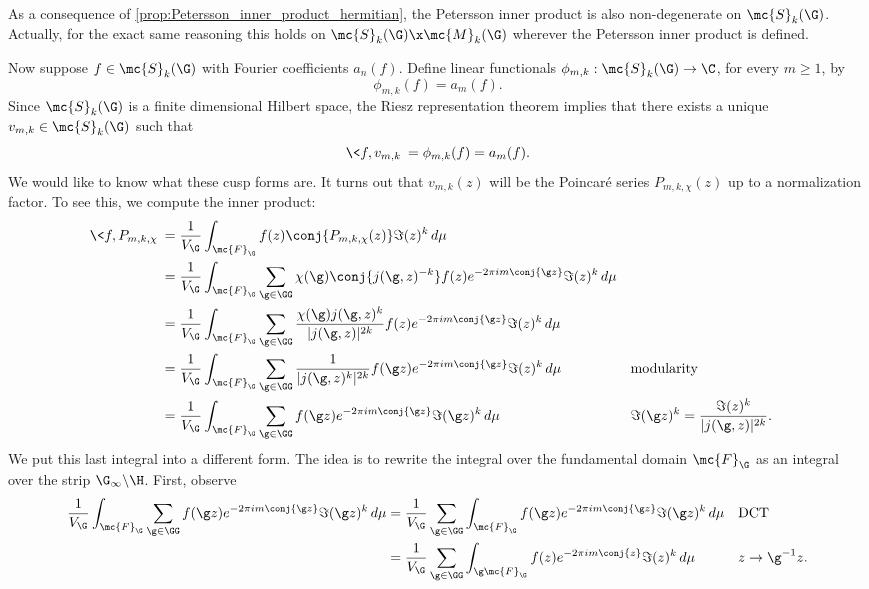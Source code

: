     \begin{remark}\label{rem:non-degeneracy_of_Petersson_inner_product}
      As a consequence of \cref{prop:Petersson_inner_product_hermitian}, the Petersson inner product is also non-degenerate on $\mc{S}_{k}(\G)$. Actually, for the exact same reasoning this holds on $\mc{S}_{k}(\G) \x \mc{M}_{k}(\G)$ wherever the Petersson inner product is defined.
    \end{remark}

    Now suppose $f \in \mc{S}_{k}(\G)$ with Fourier coefficients $a_{n}(f)$. Define linear functionals $\phi_{m,k}:\mc{S}_{k}(\G) \to \C$, for every $m \ge 1$, by
    \[
      \phi_{m,k}(f) = a_{m}(f).
    \]
    Since $\mc{S}_{k}(\G)$ is a finite dimensional Hilbert space, the Riesz representation theorem implies that there exists a unique $v_{m,k} \in \mc{S}_{k}(\G)$ such that
    \[
      \<f,v_{m,k}\> = \phi_{m,k}(f) = a_{m}(f).
    \]
    We would like to know what these cusp forms are. It turns out that $v_{m,k}(z)$ will be the Poincar\'e series $P_{m,k,\chi}(z)$ up to a normalization factor. To see this, we compute the inner product:
    \begin{align*}
      \<f,P_{m,k,\chi}\> &= \frac{1}{V_{\G}}\int_{\mc{F}_{\G}}f(z)\conj{P_{m,k,\chi}(z)}\Im(z)^{k}\,d\mu \\
      &= \frac{1}{V_{\G}}\int_{\mc{F}_{\G}}\sum_{\g \in \GG}\chi(\g)\conj{j(\g,z)^{-k}}f(z)e^{-2\pi im\conj{\g z}}\Im(z)^{k}\,d\mu \\
      &= \frac{1}{V_{\G}}\int_{\mc{F}_{\G}}\sum_{\g \in \GG}\frac{\chi(\g)j(\g,z)^{k}}{|j(\g,z)|^{2k}}f(z)e^{-2\pi im\conj{\g z}}\Im(z)^{k}\,d\mu \\
      &= \frac{1}{V_{\G}}\int_{\mc{F}_{\G}}\sum_{\g \in \GG}\frac{1}{|j(\g,z)^{k}|^{2k}}f(\g z)e^{-2\pi im\conj{\g z}}\Im(z)^{k}\,d\mu && \text{modularity} \\
      &= \frac{1}{V_{\G}}\int_{\mc{F}_{\G}}\sum_{\g \in \GG}f(\g z)e^{-2\pi im\conj{\g z}}\Im(\g z)^{k}\,d\mu && \text{$\Im(\g z)^{k} = \frac{\Im(z)^{k}}{|j(\g,z)|^{2k}}$.}
    \end{align*}
    We put this last integral into a different form. The idea is to rewrite the integral over the fundamental domain $\mc{F}_{\G}$ as an integral over the strip $\G_{\infty}\backslash\H$. First, observe
    \begin{align*}
      \frac{1}{V_{\G}}\int_{\mc{F}_{\G}}\sum_{\g \in \GG}f(\g z)e^{-2\pi im\conj{\g z}}\Im(\g z)^{k}\,d\mu &= \frac{1}{V_{\G}}\sum_{\g \in \GG}\int_{\mc{F}_{\G}}f(\g z)e^{-2\pi im\conj{\g z}}\Im(\g z)^{k}\,d\mu && \text{DCT} \\
      &= \frac{1}{V_{\G}}\sum_{\g \in \GG}\int_{\g\mc{F}_{\G}}f(z)e^{-2\pi im\conj{z}}\Im(z)^{k}\,d\mu && \text{$z \to \g^{-1}z$.}
    \end{align*}
